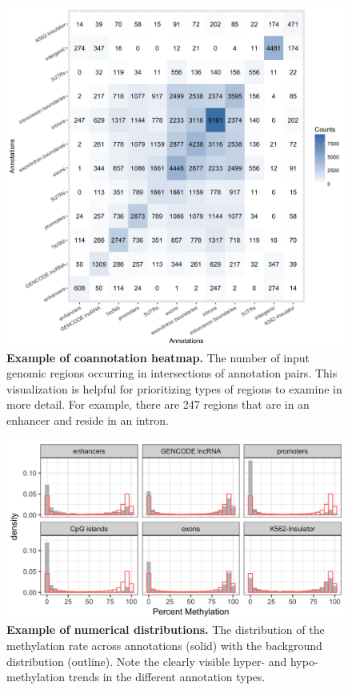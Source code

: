 \begin{figure}[ht!]
\centering
\includegraphics[width=1\textwidth]{chap4figs/figure4_3.png}
\caption[Example of annotatr coannotation heatmap.]
{
\textbf{Example of coannotation heatmap.} The number of input genomic regions occurring in intersections of annotation pairs. This visualization is helpful for prioritizing types of regions to examine in more detail. For example, there are 247 regions that are in an enhancer and reside in an intron.
}
\label{chap4:fig:3}
\end{figure}

\newpage

\begin{figure}[ht!]
\centering
\includegraphics[width=1\textwidth]{chap4figs/figure4_4.png}
\caption[Example of numerical distributions.]
{
\textbf{Example of numerical distributions.} The distribution of the methylation rate across annotations (solid) with the background distribution (outline). Note the clearly visible hyper- and hypo-methylation trends in the different annotation types.
}
\label{chap4:fig:4}
\end{figure}

